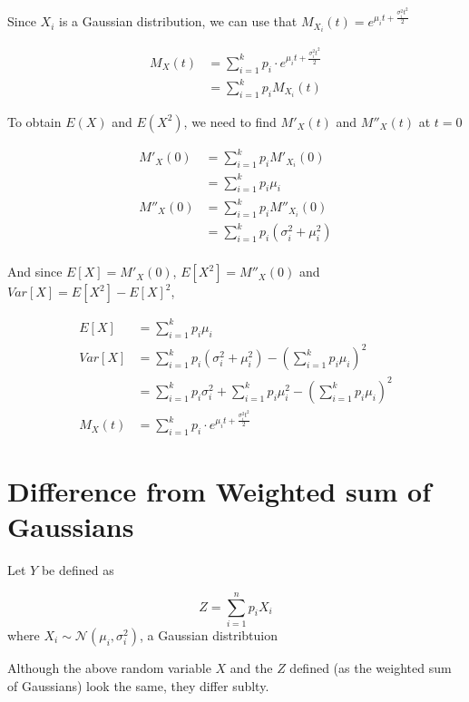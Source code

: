\documentclass[openany]{book}
\begin{document}
        Since $X_i$ is a Gaussian distribution, we can use that $M_{X_i}(t) = e^{\mu_i t + \frac{\sigma_i ^2 t^2}{2}}$
        
        \begin{align*}
            M_X(t) &= \sum_{i=1}^{k} p_i \cdot e^{\mu_i t + \frac{\sigma_i ^2 t^2}{2}} \\
            &= \sum_{i=1}^{k} p_i M_{X_i}(t)
        \end{align*}
        
        To obtain $E(X)$ and $E(X^2)$, we need to find $M'_X(t)$ and $M''_X(t)$ at $t=0$
        
        \begin{align*}
            M'_X(0) &= \sum_{i=1}^{k} p_i M'_{X_i}(0)\\
            &= \sum_{i=1}^{k} p_i \mu_i\\
            M''_X(0) &= \sum_{i=1}^{k} p_i M''_{X_i}(0)\\
            &= \sum_{i=1}^{k} p_i (\sigma_i^2 + \mu_i^2)\\
        \end{align*}
        
        And since $E[X] = M'_X(0)$, $E[X^2] = M''_X(0)$ and $Var[X] = E[X^2] - E[X]^2$,
        
        \begin{align*}
            E[X] &= \sum_{i=1}^{k} p_i \mu_i\\
            Var[X] &= \sum_{i=1}^{k} p_i (\sigma_i^2 + \mu_i^2) - (\sum_{i=1}^{k} p_i \mu_i)^2\\
            &= \sum_{i=1}^{k} p_i \sigma_i^2 + \sum_{i=1}^{k}p_i \mu_i^2 - (\sum_{i=1}^{k} p_i \mu_i)^2\\
            M_X(t) &= \sum_{i=1}^{k} p_i \cdot e^{\mu_i t + \frac{\sigma_i ^2 t^2}{2}}
        \end{align*}

    \section{Difference from Weighted sum of Gaussians}

        Let $Y$ be defined as 

            \[ Z = \sum_{i=1}^{n} p_i X_i \] 
        where $X_i \sim \mathcal{N}(\mu_i, \sigma_i^2) $, a Gaussian distribtuion

        Although the above random variable $X$ and the $Z$ defined (as the weighted sum of Gaussians) look the same, they 
        differ sublty.
        
\end{document}
